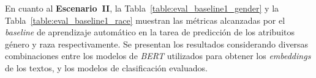 \begin{table}[htpb]
    \centering
    \caption{Resumen de m\'etricas de concordancia entre \emph{ChatGPT} y corpus final.}
    \label{table:agreement_gpt}
\end{table}

En cuanto al \textbf{Escenario~II}, la Tabla~\ref{table:eval_baseline1_gender} y la Tabla~\ref{table:eval_baseline1_race}
muestran las m\'etricas alcanzadas por el \emph{baseline} de aprendizaje autom\'atico en la tarea de 
predicci\'on de los atribuitos g\'enero y raza respectivamente. Se presentan los resultados considerando 
diversas combinaciones entre los modelos de \emph{BERT} utilizados para obtener los \emph{embeddings} de los textos, y los
modelos de clasificaci\'on evaluados. 

